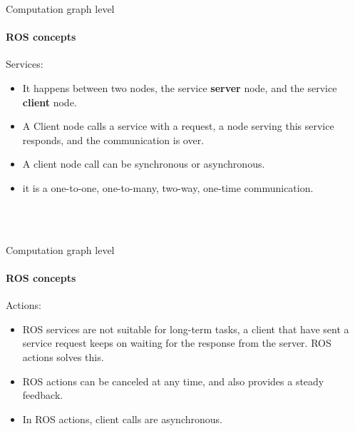 \documentclass{beamer}
\begin{document}
\begin{frame}{Computation graph level}
    \framesubtitle{ROS concepts}
    {\huge Services:}
    \vspace{0.2cm}
    \begin{itemize}
        \item It happens between two nodes, the service \textbf{server} node, and the service \textbf{client} node.
        
        \item A Client node calls a service with a request, a node serving this service responds, and the communication is over.
        
        \item A client node call can be synchronous or asynchronous.
        
        \item it is a one-to-one, one-to-many, two-way, one-time communication.
        
    \end{itemize}  
\end{frame}

     
\begin{frame}[plain]{}  
    \centering
    {\huge \textcolor{white}{Example \\ (TurtleSim again)} }
   \end{frame}
     
        
\begin{frame}{Computation graph level}
    \framesubtitle{ROS concepts}
    {\huge Actions:}
    \vspace{0.2cm}
    \begin{itemize}
        \item ROS services are not suitable for long-term tasks, a client that have sent a service request keeps on waiting for the response from the server. ROS actions solves this.
        
        \item ROS actions can be canceled at any time, and also provides a steady feedback.
        
        \item In ROS actions, client calls are asynchronous.

    \end{itemize}  
\end{frame}
\end{document}
